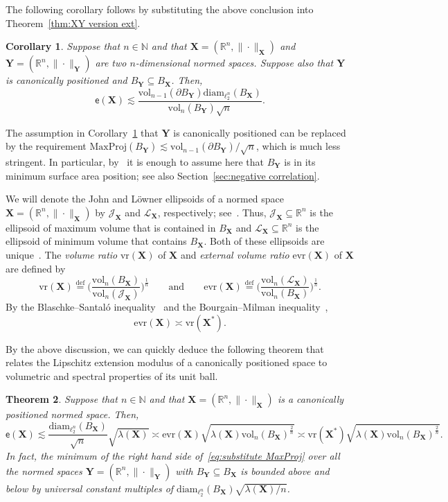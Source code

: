 \documentclass[11pt,reqno]{amsart}
\newcommand{\diam}{\mathrm{diam}}
\newcommand{\vr}{\mathrm{vr}}
\newcommand{\evr}{\mathrm{evr}}
\newcommand{\X}{\mathbf X}
\newcommand{\Y}{\mathbf Y}
\newcommand{\R}{\mathbb R}
\newtheorem{theorem}{Theorem}
\newtheorem{corollary}[theorem]{Corollary}
\theoremstyle{remark}
\renewcommand{\subset}{\subseteq}
\newcommand{\N}{\mathbb N}
\newcommand{\eqdef}{\stackrel{\mathrm{def}}{=}}
\newcommand{\ee}{\mathsf{e}}
\newcommand{\vol}{\mathrm{vol}}
\renewcommand{\1}{\mathbf 1}
\begin{document}
The following corollary follows by substituting the above conclusion into Theorem~\ref{thm:XY version ext}.




\begin{corollary}\label{cor:canonically positioned ext} Suppose that $n\in \N$ and that $\X=(\R^n,\|\cdot\|_{\X})$ and $\Y=(\R^n,\|\cdot\|_{\Y})$ are two $n$-dimensional normed spaces.  Suppose also that $\Y$ is canonically positioned and $B_\Y\subset B_\X$. Then,
$$
\ee(\X)\lesssim \frac{\vol_{n-1}(\partial B_\Y)\diam_{\ell_2^n}(B_\X)}{\vol_n(B_\Y)\sqrt{n}}.
$$
\end{corollary}
The assumption in Corollary~\ref{cor:canonically positioned ext} that $\Y$ is canonically positioned can be replaced by the requirement $\mathrm{MaxProj}(B_\Y)\lesssim \vol_{n-1}(\partial B_\Y)/\sqrt{n}$, which is much less stringent. In particular, by~\cite[Proposition~3.1]{GP99} it is enough to assume here that $B_\Y$ is in its minimum surface area position; see also Section~\ref{sec:negative correlation}.

We will denote the John and L\"owner ellipsoids of a normed space $\X=(\R^n,\|\cdot\|_\X)$ by $\mathscr{J}_\X$ and $\mathscr{L}_\X$, respectively; see~\cite{Hen12}. Thus,  $\mathscr{J}_\X\subset \R^n$ is the ellipsoid of maximum volume that is contained in $B_\X$ and $\mathscr{L}_\X\subset \R^n$ is the ellipsoid of minimum volume that contains $B_\X$. Both of these ellipsoids are unique~\cite{Joh48}. The {\em volume ratio} $\vr(\X)$ of $\X$ and {\em external volume ratio} $\evr(\X)$ of $\X$ are defined by
\begin{equation}\label{eq:def vr evr}
\vr(\X)\eqdef \bigg(\frac{\vol_n(B_\X)}{\vol_n(\mathscr{J}_\X)}\bigg)^{\frac{1}{n}}\qquad\mathrm{and}\qquad  \evr(\X)\eqdef \bigg(\frac{\vol_n(\mathscr{L}_\X)}{\vol_n(B_\X)}\bigg)^{\frac{1}{n}}.
\end{equation}
By the Blaschke--Santal\'o inequality~\cite{Bla17,San49} and the Bourgain--Milman inequality~\cite{BM87},
\begin{equation}\label{eq:state bourgain milman}
\evr(\X)\asymp \vr(\X^*).
\end{equation}

By the above discussion, we can quickly deduce the following  theorem that relates the Lipschitz extension modulus of a canonically positioned space to volumetric and spectral properties of its unit ball.

\begin{theorem}\label{thm: e spec} Suppose that $n\in \N$ and that $\X=(\R^n,\|\cdot\|_{\X})$ is a canonically positioned normed space. Then,
\begin{equation}\label{eq:ext spect}
\ee(\X)\lesssim \frac{\diam_{\ell_2^n}(B_\X)}{\sqrt{n}}\sqrt{\lambda(\X)}\asymp\evr(\X)\sqrt{\lambda(\X)\vol_n(B_\X)^{\frac{2}{n}}}\asymp \vr(\X^*)\sqrt{\lambda(\X)\vol_n(B_\X)^{\frac{2}{n}}}.
\end{equation}
In fact, the minimum of the right hand side of~\eqref{eq:substitute MaxProj} over all the normed spaces $\Y=(\R^n,\|\cdot\|_\Y)$ with $B_\Y\subset B_\X$ is bounded above and below by universal constant multiples of $\diam_{\ell_2^n}(B_\X)\sqrt{\lambda(\X)/n}$.
\end{theorem}
\end{document}
